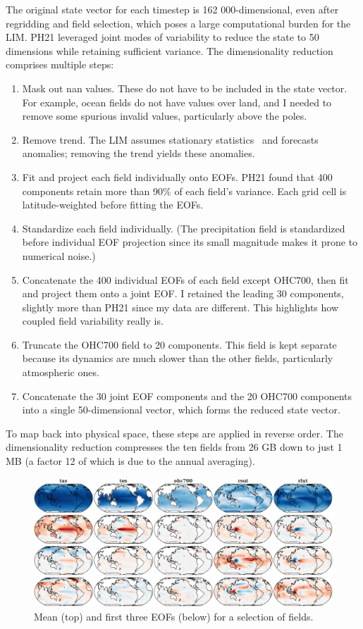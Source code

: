 \documentclass[parskip=half,DIV=16]{scrartcl}
\begin{document}
The original state vector for each timestep is 162 000-dimensional, even after regridding and field selection, which poses a large computational burden for the \gls{LIM}. PH21 leveraged joint modes of variability to reduce the state to 50 dimensions while retaining sufficient variance. The dimensionality reduction comprises multiple steps:
\begin{enumerate}
    \item Mask out nan values. These do not have to be included in the state vector. For example, ocean fields do not have values over land, and I needed to remove some spurious invalid values, particularly above the poles.
    \item Remove trend. The \gls{LIM} assumes stationary statistics~\parencite{Penland1995} and forecasts anomalies; removing the trend yields these anomalies.
    \item Fit and project each field individually onto \glspl{EOF}. PH21 found that 400 components retain more than 90\% of each field's variance. Each grid cell is latitude-weighted before fitting the \glspl{EOF}.
    \item Standardize each field individually. (The precipitation field is standardized before individual EOF projection since its small magnitude makes it prone to numerical noise.)
    \item Concatenate the 400 individual EOFs of each field except OHC700, then fit and project them onto a joint \gls{EOF}. I retained the leading 30 components, slightly more than PH21 since my data are different. This highlights how coupled field variability really is.
    \item Truncate the OHC700 field to 20 components. This field is kept separate because its dynamics are much slower than the other fields, particularly atmospheric ones.
    \item Concatenate the 30 joint EOF components and the 20 OHC700 components into a single 50-dimensional vector, which forms the reduced state vector.
\end{enumerate}
To map back into physical space, these steps are applied in reverse order. The dimensionality reduction compresses the ten fields from 26 GB down to just 1 MB (a factor 12 of which is due to the annual averaging).

\begin{figure}[h]
    \centering
    \includegraphics[width=\textwidth]{figures/plots/eofs.pdf}
    \caption{Mean (top) and first three \glspl{EOF} (below) for a selection of fields.}
    \label{fig:eofs-mine}
\end{figure}
\end{document}
